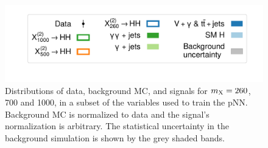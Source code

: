 \begin{figure}
    \includegraphics[width=.7\linewidth]{Figures/Dihiggs/categorisation/input_features/Graviton/Scale_equal/legend.pdf}
    \caption[Distributions of Training Features (5)]{Distributions of data, background MC, and \XTwoHH signals for $m_{\mathrm{X}}=260$, 700 and 1000\GeV, in a subset of the variables used to train the pNN. Background MC is normalized to data and the signal's normalization is arbitrary. The statistical uncertainty in the background simulation is shown by the grey shaded bands.}\label{fig:training_features_5}
\end{figure}

